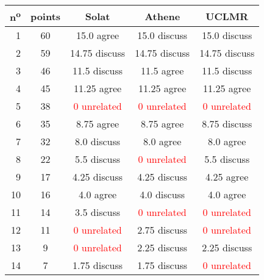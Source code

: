 \begin{center}
 \begin{tabular}{ r | c || c c c }
  n\textsuperscript{o} & points & Solat                        & Athene                       & UCLMR                        \\ \hline
  1                    & 60     & 15.0 agree                   & 15.0 discuss                 & 15.0 discuss                 \\
  2                    & 59     & 14.75 discuss                & 14.75 discuss                & 14.75 discuss                \\
  3                    & 46     & 11.5 discuss                 & 11.5 agree                   & 11.5 discuss                 \\
  4                    & 45     & 11.25 agree                  & 11.25 agree                  & 11.25 agree                  \\
  5                    & 38     & \textcolor{red}{0 unrelated} & \textcolor{red}{0 unrelated} & \textcolor{red}{0 unrelated} \\
  6                    & 35     & 8.75 agree                   & 8.75 agree                   & 8.75 discuss                 \\
  7                    & 32     & 8.0 discuss                  & 8.0 agree                    & 8.0 agree                    \\
  8                    & 22     & 5.5 discuss                  & \textcolor{red}{0 unrelated} & 5.5 discuss                  \\
  9                    & 17     & 4.25 discuss                 & 4.25 discuss                 & 4.25 agree                   \\
  10                   & 16     & 4.0 agree                    & 4.0 discuss                  & 4.0 agree                    \\
  11                   & 14     & 3.5 discuss                  & \textcolor{red}{0 unrelated} & \textcolor{red}{0 unrelated} \\
  12                   & 11     & \textcolor{red}{0 unrelated} & 2.75 discuss                 & \textcolor{red}{0 unrelated} \\
  13                   & 9      & \textcolor{red}{0 unrelated} & 2.25 discuss                 & 2.25 discuss                 \\
  14                   & 7      & 1.75 discuss                 & 1.75 discuss                 & \textcolor{red}{0 unrelated} \\

\end{tabular}
\end{center}
